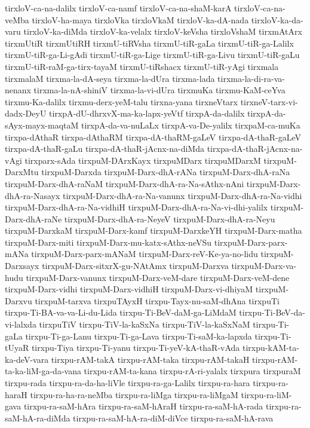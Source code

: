 {tirxloV-ca-na-dalilx
tirxloV-ca-namf
tirxloV-ca-na-shaM-karA
tirxloV-ca-na-veMba
tirxloV-ha-maya
tirxloVka
tirxloVkaM
tirxloV-ka-dA-nada
tirxloV-ka-da-varu
tirxloV-ka-diMda
tirxloV-ka-velalx
tirxloV-keVsha
tirxloVshaM
tirxmAtArx
tirxmUtiR
tirxmUtiRH
tirxmU-tiRVsha
tirxmU-tiR-gaLa
tirxmU-tiR-ga-Lalilx
tirxmU-tiR-ga-Li-gAdi
tirxmU-tiR-ga-Lige
tirxmU-tiR-ga-Livu
tirxmU-tiR-gaLu
tirxmU-tiR-raM-ga-tirx-tayaM
tirxmU-tiRshacx
tirxmU-tiR-yAgi
tirxmala
tirxmalaM
tirxma-la-dA-seya
tirxma-la-dUra
tirxma-lada
tirxma-la-di-ra-va-nenanx
tirxma-la-nA-shiniV
tirxma-la-vi-dUra
tirxmuKa
tirxmu-KaM-ceYva
tirxmu-Ka-dalilx
tirxmu-derx-yeM-talu
tirxna-yana
tirxneVtarx
tirxneV-tarx-vi-dadx-DeyU
tirxpA-dU-dhrxvX-ma-ka-lapx-yeVtf
tirxpA-da-dalilx
tirxpA-da-sAyx-mayx-maqtaM
tirxpA-da-va-nuLaLx
tirxpA-va-De-yalilx
tirxpaM-ca-muKa
tirxpa-dAthaR
tirxpa-dAthaRM
tirxpa-dA-thaRM-gaLeV
tirxpa-dA-thaR-gaLeV
tirxpa-dA-thaR-gaLu
tirxpa-dA-thaR-jAcnx-na-diMda
tirxpa-dA-thaR-jAcnx-na-vAgi
tirxparx-sAda
tirxpuM-DArxKayx
tirxpuMDarx
tirxpuMDarxM
tirxpuM-DarxMtu
tirxpuM-Darxda
tirxpuM-Darx-dhA-rANa
tirxpuM-Darx-dhA-raNa
tirxpuM-Darx-dhA-raNaM
tirxpuM-Darx-dhA-ra-Na-sAthx-nAni
tirxpuM-Darx-dhA-ra-Nasayx
tirxpuM-Darx-dhA-ra-Na-vanunx
tirxpuM-Darx-dhA-ra-Na-vidhi
tirxpuM-Darx-dhA-ra-Na-vidhiH
tirxpuM-Darx-dhA-ra-Na-vi-dhi-yalilx
tirxpuM-Darx-dhA-raNe
tirxpuM-Darx-dhA-ra-NeyeV
tirxpuM-Darx-dhA-ra-Neyu
tirxpuM-DarxkaM
tirxpuM-Darx-kamf
tirxpuM-DarxkeYH
tirxpuM-Darx-matha
tirxpuM-Darx-miti
tirxpuM-Darx-mu-katx-sAthx-neVSu
tirxpuM-Darx-parx-mANa
tirxpuM-Darx-parx-mANaM
tirxpuM-Darx-reV-Ke-ya-no-lidu
tirxpuM-Darxsayx
tirxpuM-Darx-sitxrX-gu-NAtAmx
tirxpuM-Darxva
tirxpuM-Darx-va-hudu
tirxpuM-Darx-vanunx
tirxpuM-Darx-veM-dare
tirxpuM-Darx-veM-dene
tirxpuM-Darx-vidhi
tirxpuM-Darx-vidhiH
tirxpuM-Darx-vi-dhiyaM
tirxpuM-Darxvu
tirxpuM-tarxva
tirxpuTAyxH
tirxpu-Tayx-nu-saM-dhAna
tirxpuTi
tirxpu-Ti-BA-va-va-Li-du-Lida
tirxpu-Ti-BeV-daM-ga-LiMdaM
tirxpu-Ti-BeV-da-vi-lalxda
tirxpuTiV
tirxpu-TiV-la-kaSxNa
tirxpu-TiV-la-kaSxNaM
tirxpu-Ti-gaLa
tirxpu-Ti-ga-Lanu
tirxpu-Ti-ga-Lava
tirxpu-Ti-saM-ka-lapxda
tirxpu-Ti-tUyaR
tirxpu-Tiya
tirxpu-Ti-yanu
tirxpu-Ti-yeV-kA-thaR-vAda
tirxpu-kAM-ta-ka-deV-vara
tirxpu-rAM-takA
tirxpu-rAM-taka
tirxpu-rAM-takaH
tirxpu-rAM-ta-ka-liM-ga-da-vana
tirxpu-rAM-ta-kana
tirxpu-rA-ri-yalalx
tirxpura
tirxpuraM
tirxpu-rada
tirxpu-ra-da-ha-liVle
tirxpu-ra-ga-Lalilx
tirxpu-ra-hara
tirxpu-ra-haraH
tirxpu-ra-ha-ra-neMba
tirxpu-ra-liMga
tirxpu-ra-liMgaM
tirxpu-ra-liM-gava
tirxpu-ra-saM-hAra
tirxpu-ra-saM-hAraH
tirxpu-ra-saM-hA-rada
tirxpu-ra-saM-hA-ra-diMda
tirxpu-ra-saM-hA-ra-diM-diVce
tirxpu-ra-saM-hA-rava
}
